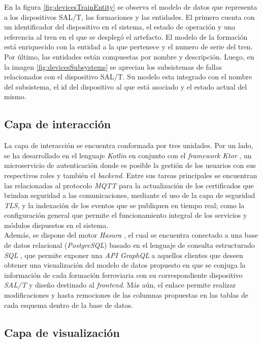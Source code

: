 \documentclass[a4paper]{IEEEtran}
\begin{document}
En la figura \ref{fig:devicesTrainEntity} se observa el modelo de datos que representa a los dispositivos SAL/T, las formaciones y las entidades. 
El primero cuenta con un identificador del dispositivo en el sistema, el estado de operación y una referencia al tren en el que se desplegó el artefacto. 
El modelo de la formación está enriquecido con la entidad a la que pertenece y el numero de serie del tren. 
Por último, las entidades están compuestas por nombre y descripción.
Luego, en la imagen \ref{fig:devicesSubsystems} se aprecian los subsistemas de fallas relacionados con el dispositivo SAL/T.
Su modelo esta integrado con el nombre del subsistema, el id del dispositivo al que está asociado y el estado actual del mismo. 

\subsection{Capa de interacción}

La capa de interacción se encuentra conformada por tres unidades. Por un lado, se ha desarrollado en el lenguaje \textit{Kotlin} \cite{b12} en conjunto con el \textit{framework} \textit{Ktor} \cite{b13}, un microservicio de autenticación donde es posible la gestión de los usuarios con sus respectivos roles y también el \textit{backend}. Entre sus tareas principales se encuentran las relacionadas al protocolo \textit{MQTT} para la actualización de los certificados que brindan seguridad a las comunicaciones, mediante el uso de la capa de seguridad \textit{TLS}, y la indexación de los eventos que se publiquen en tiempo real; como la configuración general que permite el funcionamiento integral de los servicios y módulos dispuestos en el sistema. \\

Además, se dispone del motor \textit{Hasura} \cite{b14}, el cual se encuentra conectado a una base de datos relacional (\textit{PostgreSQL}) basado en el lenguaje de consulta estructurado \textit{SQL} \cite{b15}, que permite exponer una \textit{API GraphQL} \cite{b16} a aquellos clientes que deseen obtener una visualización del modelo de datos propuesto en que se conjuga la información de cada formación ferroviaria con su correspondiente dispositivo \textit{SAL/T} y diseño destinado al \textit{frontend}. Más aún, el enlace permite realizar modificaciones y hasta remociones de las columnas propuestas en las tablas de cada esquema dentro de la base de datos.


\subsection{Capa de visualización}
\end{document}
